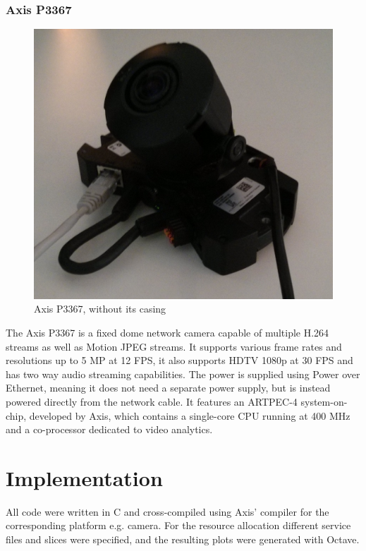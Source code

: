 \documentclass[nobiblatex]{LTHthesis}
\begin{document}
\subsection{Axis P3367}
\begin{figure}
    \centering
    \includegraphics[width=\textwidth]{p3367}
    \caption{Axis P3367, without its casing}
    \label{fig:P3367}
\end{figure}
The Axis P3367 is a fixed dome network camera capable of multiple H.264 streams as well as Motion JPEG streams. It supports various frame rates and resolutions up to 5 MP at 12 FPS, it also supports HDTV 1080p at 30 FPS and has two way audio streaming capabilities. The power is supplied using Power over Ethernet, meaning it does not need a separate power supply, but is instead powered directly from the network cable. It features an ARTPEC-4 system-on-chip, developed by Axis, which contains a single-core CPU running at 400 MHz and a co-processor dedicated to video analytics.


\chapter{Implementation}
\label{chp:development}

All code were written in C and cross-compiled using Axis' compiler for the corresponding platform e.g. camera. For the resource allocation different service files and slices were specified, and the resulting plots were generated with Octave.
\end{document}
